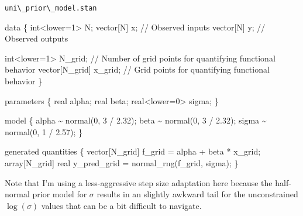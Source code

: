 \documentclass[
  letterpaper,
  DIV=11,
  numbers=noendperiod]{scrartcl}
\newenvironment{Shaded}{\begin{snugshade}}{\end{snugshade}}
\newcommand{\CommentTok}[1]{\textcolor[rgb]{0.37,0.37,0.37}{#1}}
\newcommand{\DataTypeTok}[1]{\textcolor[rgb]{0.68,0.00,0.00}{#1}}
\newcommand{\DecValTok}[1]{\textcolor[rgb]{0.68,0.00,0.00}{#1}}
\newcommand{\FloatTok}[1]{\textcolor[rgb]{0.68,0.00,0.00}{#1}}
\newcommand{\KeywordTok}[1]{\textcolor[rgb]{0.00,0.23,0.31}{#1}}
\newcommand{\NormalTok}[1]{\textcolor[rgb]{0.00,0.23,0.31}{#1}}
\begin{document}
\begin{codelisting}

\caption{\texttt{uni\textbackslash\_prior\textbackslash\_model.stan}}

\begin{Shaded}
\begin{Highlighting}[]
\KeywordTok{data}\NormalTok{ \{}
  \DataTypeTok{int}\NormalTok{\textless{}}\KeywordTok{lower}\NormalTok{=}\DecValTok{1}\NormalTok{\textgreater{} N;}
  \DataTypeTok{vector}\NormalTok{[N] x; }\CommentTok{// Observed inputs}
  \DataTypeTok{vector}\NormalTok{[N] y; }\CommentTok{// Observed outputs}

  \DataTypeTok{int}\NormalTok{\textless{}}\KeywordTok{lower}\NormalTok{=}\DecValTok{1}\NormalTok{\textgreater{} N\_grid; }\CommentTok{// Number of grid points for quantifying functional behavior}
  \DataTypeTok{vector}\NormalTok{[N\_grid] x\_grid; }\CommentTok{// Grid points for quantifying functional behavior}
\NormalTok{\}}

\KeywordTok{parameters}\NormalTok{ \{}
  \DataTypeTok{real}\NormalTok{ alpha;}
  \DataTypeTok{real}\NormalTok{ beta;}
  \DataTypeTok{real}\NormalTok{\textless{}}\KeywordTok{lower}\NormalTok{=}\DecValTok{0}\NormalTok{\textgreater{} sigma;}
\NormalTok{\}}

\KeywordTok{model}\NormalTok{ \{}
\NormalTok{  alpha \textasciitilde{} normal(}\DecValTok{0}\NormalTok{, }\DecValTok{3}\NormalTok{ / }\FloatTok{2.32}\NormalTok{);}
\NormalTok{  beta \textasciitilde{} normal(}\DecValTok{0}\NormalTok{, }\DecValTok{3}\NormalTok{ / }\FloatTok{2.32}\NormalTok{);}
\NormalTok{  sigma \textasciitilde{} normal(}\DecValTok{0}\NormalTok{, }\DecValTok{1}\NormalTok{ / }\FloatTok{2.57}\NormalTok{);}
\NormalTok{\}}

\KeywordTok{generated quantities}\NormalTok{ \{}
  \DataTypeTok{vector}\NormalTok{[N\_grid] f\_grid = alpha + beta * x\_grid;}
  \DataTypeTok{array}\NormalTok{[N\_grid] }\DataTypeTok{real}\NormalTok{ y\_pred\_grid = normal\_rng(f\_grid, sigma);}
\NormalTok{\}}
\end{Highlighting}
\end{Shaded}

\end{codelisting}

Note that I'm using a less-aggressive step size adaptation here because
the half-normal prior model for \(\sigma\) results in an slightly
awkward tail for the unconstrained \(\log(\sigma)\) values that can be a
bit difficult to navigate.
\end{document}
